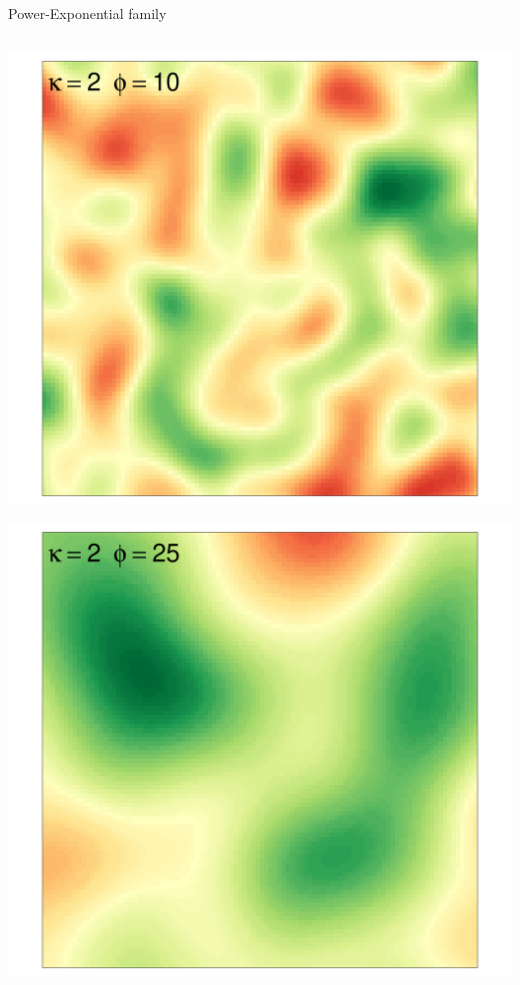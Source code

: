 \documentclass[
  ignorenonframetext,
]{beamer}
\begin{document}
\begin{frame}{Power-Exponential family}
\begin{columns}[T]
\begin{column}{0.33\textwidth}
\includegraphics{Lecture_1_files/figure-beamer/unnamed-chunk-19-1.pdf}

\includegraphics{Lecture_1_files/figure-beamer/unnamed-chunk-20-1.pdf}
\end{column}


\end{columns}
\end{frame}
\end{document}
